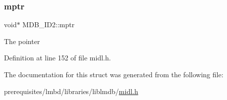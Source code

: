 \mbox{\label{struct_m_d_b___i_d2_af23b32045b25744304bee13ac3ea8794}} 
\subsubsection{\texorpdfstring{mptr}{mptr}}
{\footnotesize\ttfamily void$\ast$ M\+D\+B\+\_\+\+I\+D2\+::mptr}

The pointer 

Definition at line 152 of file midl.\+h.



The documentation for this struct was generated from the following file\+:\begin{DoxyCompactItemize}
\item 
prerequisites/lmbd/libraries/liblmdb/\mbox{\hyperlink{midl_8h}{midl.\+h}}\end{DoxyCompactItemize}
